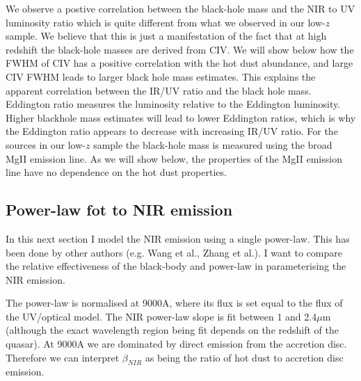 We observe a postive correlation between the black-hole mass and the NIR to UV luminosity ratio which is quite different from what we observed in our low-$z$ sample. 
We believe that this is just a manifestation of the fact that at high redshift the black-hole masses are derived from CIV. 
We will show below how the FWHM of CIV has a positive correlation with the hot dust abundance, and large CIV FWHM leads to larger black hole mass estimates. 
This explains the apparent correlation between the IR/UV ratio and the black hole mass. 
Eddington ratio measures the luminosity relative to the Eddington luminosity. 
Higher blackhole mass estimates will lead to lower Eddington ratios, which is why the Eddington ratio appears to decrease with increasing IR/UV ratio. 
For the sources in our low-$z$ sample the black-hole mass is measured using the broad MgII emission line. 
As we will show below, the properties of the MgII emission line have no dependence on the hot dust properties. 

\subsection{Power-law fot to NIR emission}

In this next section I model the NIR emission using a single power-law. 
This has been done by other authors (e.g. Wang et al., Zhang et al.). 
I want to compare the relative effectiveness of the black-body and power-law in parameterising the NIR emission. 

The power-law is normalised at 9000A, where its flux is set equal to the flux of the UV/optical model. 
The NIR power-law slope is fit between 1 and 2.4$\mu$m (although the exact wavelength region being fit depends on the redshift of the quasar). 
At 9000A we are dominated by direct emission from the accretion disc. 
Therefore we can interpret $\beta_{NIR}$ as being the ratio of hot dust to accretion disc emission. 

